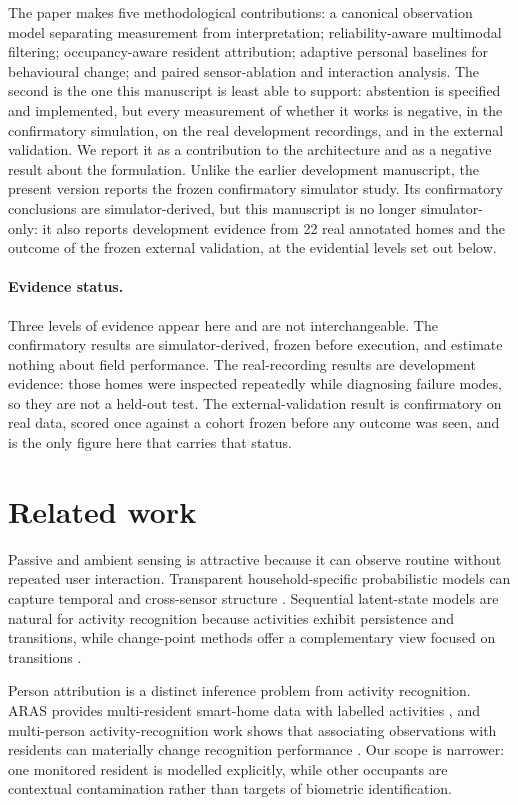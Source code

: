 \documentclass[11pt]{article}
\begin{document}
The paper makes five methodological contributions: a canonical observation model separating measurement from interpretation; reliability-aware multimodal filtering; occupancy-aware resident attribution; adaptive personal baselines for behavioural change; and paired sensor-ablation and interaction analysis. The second is the one this manuscript is least able to support: abstention is specified and implemented, but every measurement of whether it works is negative, in the confirmatory simulation, on the real development recordings, and in the external validation. We report it as a contribution to the architecture and as a negative result about the formulation. Unlike the earlier development manuscript, the present version reports the frozen confirmatory simulator study. Its confirmatory conclusions are simulator-derived, but this manuscript is no longer simulator-only: it also reports development evidence from 22 real annotated homes and the outcome of the frozen external validation, at the evidential levels set out below.

\paragraph{Evidence status.}
Three levels of evidence appear here and are not interchangeable. The confirmatory results are simulator-derived, frozen before execution, and estimate nothing about field performance. The real-recording results are development evidence: those homes were inspected repeatedly while diagnosing failure modes, so they are not a held-out test. The external-validation result is confirmatory on real data, scored once against a cohort frozen before any outcome was seen, and is the only figure here that carries that status.

\section{Related work}

Passive and ambient sensing is attractive because it can observe routine without repeated user interaction. Transparent household-specific probabilistic models can capture temporal and cross-sensor structure \citep{gillam2022athome}. Sequential latent-state models are natural for activity recognition because activities exhibit persistence and transitions, while change-point methods offer a complementary view focused on transitions \citep{asghari2019hhmm,bermejo2021cpd,culman2020cpam}.

Person attribution is a distinct inference problem from activity recognition. ARAS provides multi-resident smart-home data with labelled activities \citep{alemdar2013aras}, and multi-person activity-recognition work shows that associating observations with residents can materially change recognition performance \citep{wang2022multiperson}. Our scope is narrower: one monitored resident is modelled explicitly, while other occupants are contextual contamination rather than targets of biometric identification.
\end{document}
